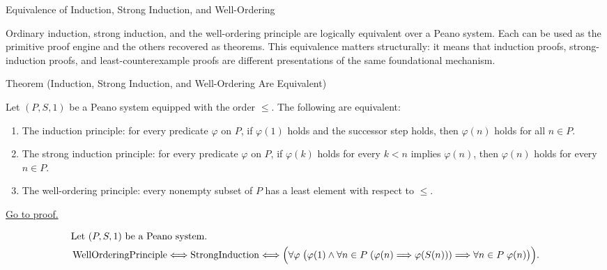 \begin{topicbox}{Equivalence of Induction, Strong Induction, and Well-Ordering}
\begin{exposition}
Ordinary induction, strong induction, and the well-ordering principle are
logically equivalent over a Peano system. Each can be used as the primitive
proof engine and the others recovered as theorems. This equivalence matters
structurally: it means that induction proofs, strong-induction proofs, and
least-counterexample proofs are different presentations of the same
foundational mechanism.
\end{exposition}

\begin{theorembox}{Theorem (Induction, Strong Induction, and Well-Ordering Are Equivalent)}
\begin{theorem}
\label{thm:induction-well-ordering-equivalence}
Let $(P,S,1)$ be a Peano system equipped with the order $\le$. The following
are equivalent:
\begin{enumerate}
  \item The induction principle: for every predicate $\varphi$ on $P$, if
  $\varphi(1)$ holds and the successor step holds, then $\varphi(n)$ holds
  for all $n \in P$.
  \item The strong induction principle: for every predicate $\varphi$ on $P$,
  if $\varphi(k)$ holds for every $k<n$ implies $\varphi(n)$, then
  $\varphi(n)$ holds for every $n \in P$.
  \item The well-ordering principle: every nonempty subset of $P$ has a least
  element with respect to $\le$.
\end{enumerate}
\hyperref[prf:induction-well-ordering-equivalence]{Go to proof.}
\end{theorem}
\end{theorembox}

\begin{remark*}
\[
\begin{aligned}
&\text{Let } (P,S,1) \text{ be a Peano system.}\\
&\operatorname{WellOrderingPrinciple}
\Longleftrightarrow
\operatorname{StrongInduction}
\Longleftrightarrow
\Bigl(\forall \varphi\;
\bigl(\varphi(1) \land
\forall n \in P\;(\varphi(n) \Longrightarrow \varphi(S(n)))
\Longrightarrow
\forall n \in P\;\varphi(n)\bigr)\Bigr).
\end{aligned}
\]
\end{remark*}


\end{topicbox}
